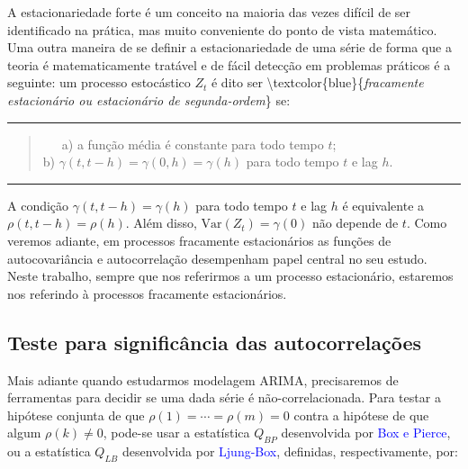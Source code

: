 \documentclass[
]{book}
\theoremstyle{definition}
\theoremstyle{definition}
\theoremstyle{definition}
\theoremstyle{remark}
\begin{document}
A estacionariedade forte é um conceito na maioria das vezes difícil de ser identificado na prática, mas muito conveniente do ponto de vista matemático. Uma outra maneira de se definir a estacionariedade de uma série de forma que a teoria é matematicamente tratável e de fácil detecção em problemas práticos é a seguinte: um processo estocástico \(Z_t\) é dito ser \textbackslash textcolor\{blue\}\{\emph{fracamente estacionário ou estacionário de segunda-ordem}\} se:

\begin{center}\rule{0.5\linewidth}{0.5pt}\end{center}

\begin{quote}
~~~a) a função média é constante para todo tempo \(t\);\\
\hspace*{0.333em}\hspace*{0.333em}\hspace*{0.333em}b) \(\gamma(t,t-h) = \gamma(0,h)=\gamma(h)\) para todo tempo \(t\) e lag \(h\).
\end{quote}

\begin{center}\rule{0.5\linewidth}{0.5pt}\end{center}

A condição \(\gamma(t,t-h) = \gamma(h)\) para todo tempo \(t\) e lag \(h\) é equivalente a \(\rho(t,t-h) = \rho(h)\). Além disso, \(\mbox{Var}(Z_t)=\gamma(0)\) não depende de \(t\). Como veremos adiante, em processos fracamente estacionários as funções de autocovariância e autocorrelação desempenham papel central no seu estudo. Neste trabalho, sempre que nos referirmos a um processo estacionário, estaremos nos referindo à processos fracamente estacionários.

\hypertarget{teste-para-significuxe2ncia-das-autocorrelauxe7uxf5es}{%
\subsection{Teste para significância das autocorrelações}\label{teste-para-significuxe2ncia-das-autocorrelauxe7uxf5es}}

Mais adiante quando estudarmos modelagem ARIMA, precisaremos de ferramentas para decidir se uma dada série é não-correlacionada. Para testar a hipótese conjunta de que \(\rho(1)=\cdots=\rho(m)=0\) contra a hipótese de que algum \(\rho(k)\neq0\), pode-se usar a estatística \(Q_{BP}\) desenvolvida por \textcolor{blue}{Box e Pierce}, ou a estatística \(Q_{LB}\) desenvolvida por \textcolor{blue}{Ljung-Box}, definidas, respectivamente, por:
\end{document}
